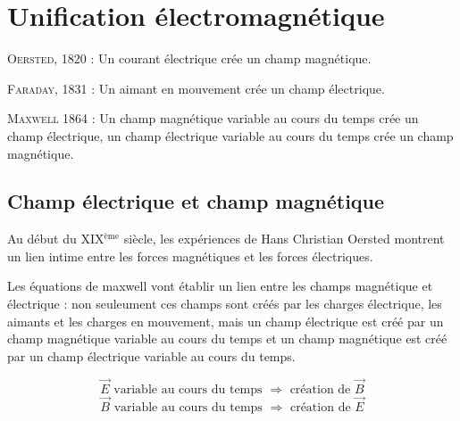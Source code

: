 
\section{Unification électromagnétique}
%
\textsc{Oersted}, 1820 : Un courant électrique crée un champ magnétique.

\textsc{Faraday}, 1831 : Un aimant en mouvement crée un champ électrique.

\textsc{Maxwell} 1864 : Un champ magnétique variable au cours du temps crée un champ électrique, un champ électrique variable au cours du temps crée un champ magnétique.

\subsection{Champ électrique et champ magnétique}

Au début du XIX$^\text{ème}$ siècle, les expériences de Hans Christian Oersted montrent un lien intime entre les forces magnétiques et les forces électriques.

Les équations de maxwell vont établir un lien entre les champs magnétique et électrique : non seuleument ces champs sont créés par les charges électrique, les aimants et les charges en mouvement, mais un champ électrique est créé par un champ magnétique variable au cours du temps et un champ magnétique est créé par un champ électrique variable au cours du temps.

\[
\overrightarrow{E} \text{ variable au cours du temps } \Rightarrow \text{ création de } \overrightarrow{B}
\]
\[
\overrightarrow{B} \text{ variable au cours du temps } \Rightarrow \text{ création de } \overrightarrow{E}
\]



